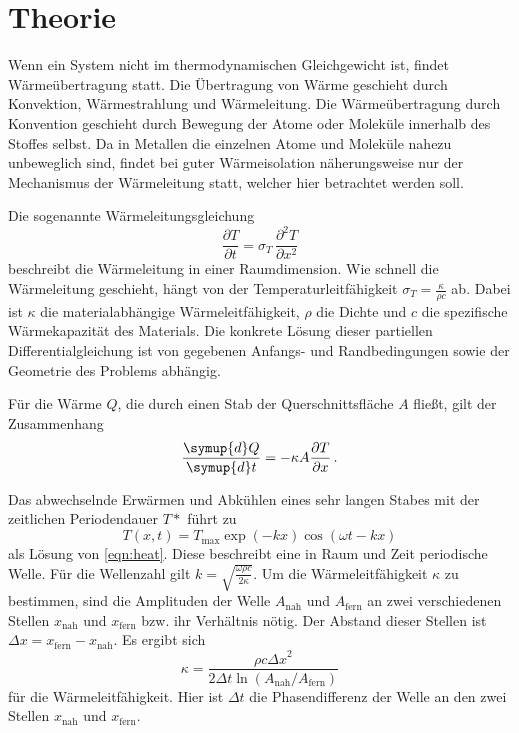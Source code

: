 \section{Theorie}
\label{sec:Theorie}
Wenn ein System nicht im thermodynamischen Gleichgewicht ist, findet Wärmeübertragung statt.
Die Übertragung von Wärme geschieht durch Konvektion, Wärmestrahlung und Wärmeleitung.
Die Wärmeübertragung durch Konvention geschieht durch Bewegung der Atome oder
Moleküle innerhalb des Stoffes selbst. Da in Metallen die einzelnen Atome und
Moleküle nahezu unbeweglich sind, findet bei guter Wärmeisolation näherungsweise
nur der Mechanismus der Wärmeleitung statt, welcher hier betrachtet werden soll.

Die sogenannte Wärmeleitungsgleichung
\begin{equation}
  \dfrac{\partial T}{\partial t} = \sigma_T \, \dfrac{\partial^2 T}{\partial x^2}
  \label{eqn:heat}
\end{equation}
beschreibt die Wärmeleitung in einer Raumdimension. Wie schnell die Wärmeleitung
geschieht, hängt von der Temperaturleitfähigkeit $\sigma_T = \frac{\kappa}{\rho c}$
ab. Dabei ist $\kappa$ die materialabhängige Wärmeleitfähigkeit, $\rho$ die Dichte
und $c$ die spezifische Wärmekapazität des Materials. Die konkrete Lösung dieser
partiellen Differentialgleichung ist von gegebenen Anfangs- und Randbedingungen sowie
der Geometrie des Problems abhängig.

Für die Wärme $Q$, die durch einen Stab der Querschnittsfläche $A$ fließt, gilt
der Zusammenhang
\begin{equation}
  \dfrac{\symup{d} Q}{\symup{d} t} = - \kappa A \dfrac{\partial T}{\partial x}\,.
  \label{eqn:waerme}
\end{equation}

Das abwechselnde Erwärmen und Abkühlen eines sehr langen Stabes mit der zeitlichen
Periodendauer $T*$ führt zu
\begin{equation}
  T(x,t) = T_\text{max} \exp(-kx) \cos(\omega t - kx)
  \label{eqn:tempwelle}
\end{equation}
als Lösung von \eqref{eqn:heat}. Diese beschreibt eine in Raum und Zeit periodische
Welle. Für die Wellenzahl gilt $k = \sqrt{\frac{\omega \rho c}{2 \kappa}}$.
Um die Wärmeleitfähigkeit $\kappa$ zu bestimmen, sind die Amplituden der Welle
$A_\text{nah}$ und $A_\text{fern}$ an zwei verschiedenen Stellen $x_\text{nah}$
und $x_\text{fern}$ bzw. ihr Verhältnis nötig. Der Abstand dieser Stellen ist
$\Delta x = x_\text{fern} - x_\text{nah}$. Es ergibt sich
\begin{equation}
  \kappa = \frac{\rho c {\Delta x}^2}{2 \Delta t \ln \left(A_\text{nah}/A_\text{fern}\right)}
  \label{eqn:kappa}
\end{equation}
für die Wärmeleitfähigkeit. Hier ist $\Delta t$ die Phasendifferenz der Welle
an den zwei Stellen $x_\text{nah}$ und $x_\text{fern}$.

